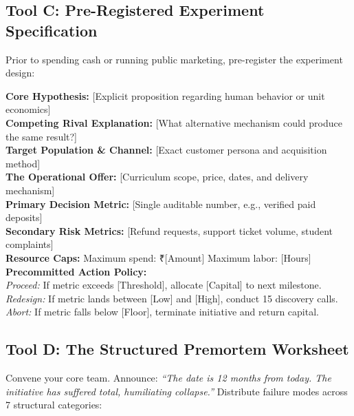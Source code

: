 \subsection{Tool C: Pre-Registered Experiment Specification}

Prior to spending cash or running public marketing, pre-register the experiment design:

\begin{tcolorbox}[
  enhanced,
  colback=BayesSurface!60,
  colframe=BayesBorder,
  boxrule=0.5pt,
  arc=3pt,
  left=4pt,right=4pt,top=4pt,bottom=4pt,
  boxsep=1pt
]
\scriptsize
\textbullet{} \textbf{Core Hypothesis:} [Explicit proposition regarding human behavior or unit economics] \\
\textbullet{} \textbf{Competing Rival Explanation:} [What alternative mechanism could produce the same result?] \\
\textbullet{} \textbf{Target Population \& Channel:} [Exact customer persona and acquisition method] \\
\textbullet{} \textbf{The Operational Offer:} [Curriculum scope, price, dates, and delivery mechanism] \\
\textbullet{} \textbf{Primary Decision Metric:} [Single auditable number, e.g., verified paid deposits] \\
\textbullet{} \textbf{Secondary Risk Metrics:} [Refund requests, support ticket volume, student complaints] \\
\textbullet{} \textbf{Resource Caps:} Maximum spend: ₹[Amount] \quad Maximum labor: [Hours] \\
\textbullet{} \textbf{Precommitted Action Policy:} \\
\quad \textit{Proceed:} If metric exceeds [Threshold], allocate [Capital] to next milestone. \\
\quad \textit{Redesign:} If metric lands between [Low] and [High], conduct 15 discovery calls. \\
\quad \textit{Abort:} If metric falls below [Floor], terminate initiative and return capital.
\end{tcolorbox}

\subsection{Tool D: The Structured Premortem Worksheet}

Convene your core team. Announce: \textit{``The date is 12 months from today. The initiative has suffered total, humiliating collapse.''} Distribute failure modes across 7 structural categories:


